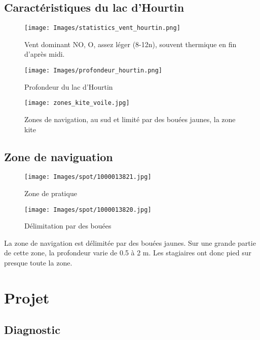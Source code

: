 \documentclass[12pt,a4paper]{report}
\begin{document}
\subsection{Caractéristiques du lac d'Hourtin}
\begin{figure}
\texttt{[image: Images/statistics\_vent\_hourtin.png]} 
\caption{Vent dominant NO, O, assez léger (8-12n), 
souvent thermique en fin d'après midi.\label{vent_stats}}

\end{figure}

\begin{figure}
\texttt{[image: Images/profondeur\_hourtin.png]} 
\caption{Profondeur du lac d'Hourtin\label{carte_profondeur}}
\end{figure}

\begin{figure}
\texttt{[image: zones\_kite\_voile.jpg]} 
\caption{Zones de navigation, au sud et limité par des bouées jaunes, la zone kite\label{zones_nav}}
\end{figure}


\subsection{Zone de naviguation}
\begin{figure}
\begin{minipage}{0.4\textwidth}
\texttt{[image: Images/spot/1000013821.jpg]} 
\caption{Zone de pratique}
\end{minipage}
\hfill
\begin{minipage}{0.4\textwidth}
\texttt{[image: Images/spot/1000013820.jpg]} 
\caption{Délimitation par des bouées}
\end{minipage}
\end{figure}
La zone de navigation est délimitée par des bouées jaunes.
Sur une grande partie de cette zone, la profondeur varie de 0.5 à 2 m.
Les stagiaires ont donc pied sur presque toute la zone.
\section{Projet}
\subsection{Diagnostic}
\end{document}
